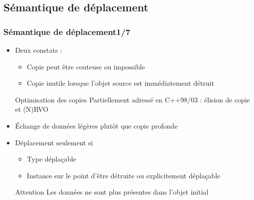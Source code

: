 \documentclass[C++.tex]{subfiles}
\begin{document}
\subsection*{Sémantique de déplacement}
\begin{frame}
	\frametitle{Sémantique de déplacement\titlehfill{}1/7}
	\begin{itemize}
		\item Deux constats :
		\begin{itemize}
			\item Copie peut être couteuse ou impossible


			\item Copie inutile lorsque l'objet source est immédiatement détruit
		\end{itemize}

		\begin{block}{Optimisation des copies}
			Partiellement adressé en C++98/03 : élision de copie et (N)RVO 

		\end{block}

		\item Échange de données légères plutôt que copie profonde


		\item Déplacement seulement si
		\begin{itemize}
			\item Type déplaçable
			\item Instance sur le point d'être détruite ou explicitement déplaçable
		\end{itemize}

		\begin{alertblock}{Attention}
			Les données ne sont plus présentes dans l'objet initial
		\end{alertblock}
	\end{itemize}
\end{frame}
\end{document}

